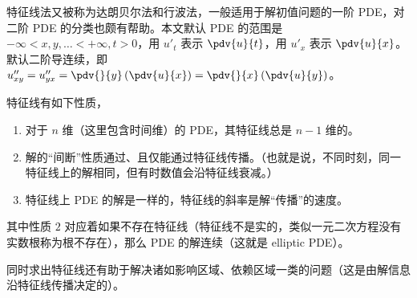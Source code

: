 

特征线法又被称为达朗贝尔法和行波法，一般适用于解初值问题的一阶 PDE，对二阶 PDE 的分类也颇有帮助。本文默认 PDE 的范围是 $-\infty < x, y, \dots < +\infty, t>0$，用 $u'_t$ 表示 $\pdv{u}{t}$，用 $u'_x$ 表示 $\pdv{u}{x}$。默认二阶导连续，即 $u''_{xy} = u''_{yx} = \pdv{}{y}\left(\pdv{u}{x}\right) = \pdv{}{x}\left(\pdv{u}{y}\right)$。

特征线有如下性质，
\begin{enumerate}
\item 对于 $n$ 维（这里包含时间维）的 PDE，其特征线总是 $n-1$ 维的。
\item 解的“间断”性质通过、且仅能通过特征线传播。（也就是说，不同时刻，同一特征线上的解相同，但有时数值会沿特征线衰减。）
\item 特征线上 PDE 的解是一样的，特征线的斜率是解“传播”的速度。
\end{enumerate}
其中性质 $2$ 对应着如果不存在特征线（特征线不是实的，类似一元二次方程没有实数根称为根不存在），那么 PDE 的解连续（这就是 elliptic PDE）。

同时求出特征线还有助于解决诸如影响区域、依赖区域一类的问题（这是由解信息沿特征线传播决定的）。
































